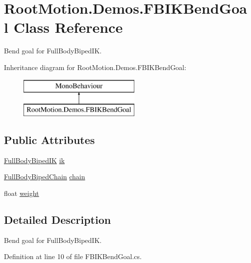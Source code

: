 \hypertarget{class_root_motion_1_1_demos_1_1_f_b_i_k_bend_goal}{}\section{Root\+Motion.\+Demos.\+F\+B\+I\+K\+Bend\+Goal Class Reference}
\label{class_root_motion_1_1_demos_1_1_f_b_i_k_bend_goal}


Bend goal for Full\+Body\+Biped\+IK.  


Inheritance diagram for Root\+Motion.\+Demos.\+F\+B\+I\+K\+Bend\+Goal\+:\begin{figure}[H]
\begin{center}
\leavevmode
\includegraphics[height=2.000000cm]{class_root_motion_1_1_demos_1_1_f_b_i_k_bend_goal}
\end{center}
\end{figure}
\subsection*{Public Attributes}
\begin{DoxyCompactItemize}
\item 
\mbox{\hyperlink{class_root_motion_1_1_final_i_k_1_1_full_body_biped_i_k}{Full\+Body\+Biped\+IK}} \mbox{\hyperlink{class_root_motion_1_1_demos_1_1_f_b_i_k_bend_goal_a98e3da4069b5be2eab76b55c5808120e}{ik}}
\item 
\mbox{\hyperlink{namespace_root_motion_1_1_final_i_k_ae8848c0353270a08dcfe8b85a5c9b761}{Full\+Body\+Biped\+Chain}} \mbox{\hyperlink{class_root_motion_1_1_demos_1_1_f_b_i_k_bend_goal_a2cd0456dd3b10c7cae9222d5a88437d6}{chain}}
\item 
float \mbox{\hyperlink{class_root_motion_1_1_demos_1_1_f_b_i_k_bend_goal_a498d834e9591591b37ee04f028d542b1}{weight}}
\end{DoxyCompactItemize}


\subsection{Detailed Description}
Bend goal for Full\+Body\+Biped\+IK. 



Definition at line 10 of file F\+B\+I\+K\+Bend\+Goal.\+cs.



